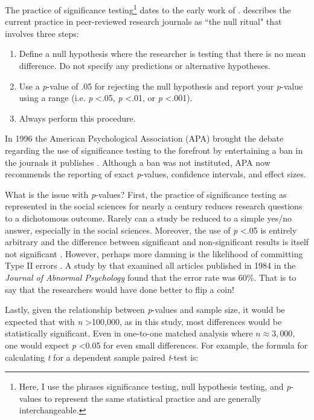\documentclass[letterpaper,12p,twoside]{article} %
\begin{document}

The practice of significance testing\footnote{Here, I use the phrases significance testing, null hypothesis testing, and \textit{p}-values to represent the same statistical practice and are generally interchangeable.} dates to the early work of .  describes the current practice in peer-reviewed research journals as ``the null ritual" that involves three steps:

\begin{enumerate}
    \item Define a null hypothesis where the researcher is testing that there is no mean difference. Do not specify any predictions or alternative hypotheses.
    \item Use a \textit{p}-value of .05 for rejecting the null hypothesis and report your \textit{p}-value using a range (i.e. \textit{p} \textless .05, \textit{p} \textless .01, or \textit{p} \textless .001).
    \item Always perform this procedure.
\end{enumerate}

\noindent In 1996 the American Psychological Association (APA) brought the debate regarding the use of significance testing to the forefront by entertaining a ban in the journals it publishes \cite{Shrout1997,Hunter1997,Harris1997,Abelson1997,Scarr1997,Estes1997}. Although a ban was not instituted, APA now recommends the reporting of exact \textit{p}-values, confidence intervals, and effect sizes. 

What is the issue with \textit{p}-values? First, the practice of significance testing as represented in the social sciences for nearly a century reduces research questions to a dichotomous outcome. Rarely can a study be reduced to a simple yes/no answer, especially in the social sciences. Moreover, the use of \textit{p} \textless .05 is entirely arbitrary and the difference between significant and non-significant results is itself not significant \cite{GelmanStern2006}. However, perhaps more damning is the likelihood of committing Type II errors \cite{Bakan1966,Carver1978,Cohen1994,HenkelMorrison1970,Rozeboom1960,Schmidt1996}. A study by  that examined all articles published in 1984 in the \textit{Journal of Abnormal Psychology} found that the error rate was 60\%. That is to say that the researchers would have done better to flip a coin!

Lastly, given the relationship between \textit{p}-values and sample size, it would be expected that with \textit{n} \textgreater 100,000, as in this study, most differences would be statistically significant. Even in one-to-one matched analysis where $n \approx 3,000$, one would expect \textit{p} \textless 0.05 for even small differences. For example, the formula for calculating \textit{t} for a dependent sample paired \textit{t}-test is:
\end{document}
